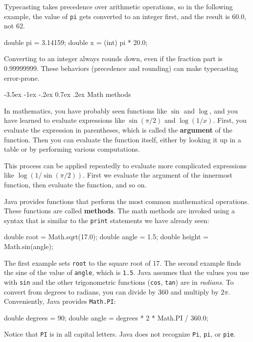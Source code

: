 \documentclass{book}
\makeatletter
\renewcommand{\section}{\@startsection 
    {section} {1} {0mm}%
    {-3.5ex \@plus -1ex \@minus -.2ex}%
    {0.7ex \@plus.2ex}%
    {\normalfont\Large\bfseries}}
\makeatother
\begin{document}
Typecasting takes precedence over arithmetic operations,
so in the following example, the value of {\tt pi} gets
converted to an integer first, and the result
is 60.0, not 62.

\begin{verbatimtab}
    double pi = 3.14159;
    double x = (int) pi * 20.0;
\end{verbatimtab}
% 
Converting to an integer always rounds down, even if the fraction
part is 0.99999999.  These behaviors (precedence and rounding)
can make typecasting error-prone.


\section{Math methods}

In mathematics, you have probably seen functions like $\sin$ and
$\log$, and you have learned to evaluate expressions like
$\sin(\pi/2)$ and $\log(1/x)$.  First, you evaluate the
expression in parentheses, which is called the {\bf argument} of the
function.
Then you can evaluate the function itself, either by looking it up in
a table or by performing various computations.

This process can be applied repeatedly to evaluate more complicated
expressions like $\log(1/\sin(\pi/2))$.  First we evaluate the
argument of the innermost function, then evaluate the function,
and so on.

Java provides functions that perform the most
common mathematical operations.  These functions
are called {\bf methods}.
The math methods are invoked using a syntax that is similar to
the {\tt print} statements we have already seen:

\begin{verbatimtab}
     double root = Math.sqrt(17.0);
     double angle = 1.5;
     double height = Math.sin(angle);
\end{verbatimtab}
%
The first example sets {\tt root} to the square root of 17.
The second example finds the sine of the value of {\tt angle},
which is {\tt 1.5}.  Java assumes that the
values you use with {\tt sin} and the other trigonometric functions
({\tt cos}, {\tt tan}) are in {\em radians}.  To
convert from degrees to radians, you can divide by 360
and multiply by $2 \pi$.  Conveniently, Java provides {\tt Math.PI}:

\begin{verbatimtab}
     double degrees = 90;
     double angle = degrees * 2 * Math.PI / 360.0;
\end{verbatimtab}
%
Notice that {\tt PI} is in all capital letters.  Java does
not recognize {\tt Pi}, {\tt pi}, or {\tt pie}.
\end{document}
